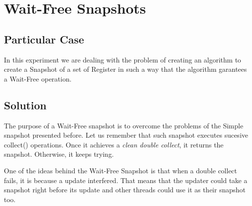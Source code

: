 \section{\textbf{Wait-Free Snapshots}}
\subsection{Particular Case}
\par
In this experiment we are dealing with the problem of creating an algorithm to
create a Snapshot of a set of Register in such a way that the algorithm
garantees a Wait-Free operation.
\par
\subsection{Solution}
\par
The purpose of a Wait-Free snapshot is to overcome the problems of the Simple snapshot presented before. Let us remember that such snapshot executes sucesive collect() operations. Once it achieves a \textit{clean double collect}, it returns the snapshot. Otherwise, it keeps trying. 
\par
One of the ideas behind the Wait-Free Snapshot is that when a double collect fails, it is because a update interfered. That means that the updater could take a snapshot right before its update and other threads could use it as their snapshot too. 
\par
